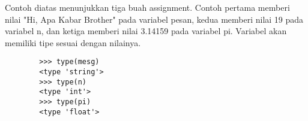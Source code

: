 Contoh diatas menunjukkan tiga buah assignment. Contoh pertama memberi nilai "Hi, Apa Kabar Brother" pada variabel pesan, kedua memberi nilai 19 pada variabel n, dan ketiga memberi nilai 3.14159 pada variabel pi. Variabel akan memiliki tipe sesuai dengan nilainya.
    \begin{verbatim}
        >>> type(mesg)
        <type 'string'>
        >>> type(n)
        <type 'int'>
        >>> type(pi)
        <type 'float'>
     \end{verbatim}
